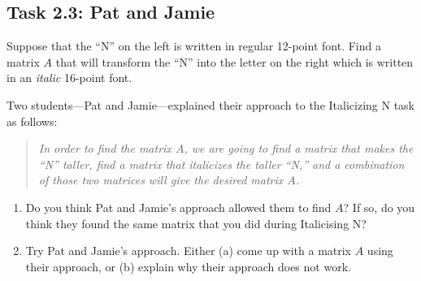 \documentclass{problemset}
\begin{document}
\begin{iola}
\section*{Task 2.3: Pat and Jamie}

\begin{minipage}{.5\textwidth}
\hfill
{}\hfill
\end{minipage}
\begin{minipage}{.5\textwidth}

Suppose that the ``N'' on the left is written in regular 12-point font.  Find a matrix $A$ that will transform
	the ``N'' into the letter on the right which is written in an \emph{italic} 16-point font.
\end{minipage}

Two students---Pat and Jamie---explained their approach to the Italicizing N task as follows:
\begin{quote}\itshape
	In order to find the matrix $A$, we are going to find a matrix that makes the ``N'' taller,
	find a matrix that italicizes the taller ``N,'' and a combination of those two matrices
	will give the desired matrix $A$.
\end{quote}

\begin{enumerate}
	\item Do you think Pat and Jamie's approach allowed them to find $A$?  If so, do
		you think they found the same matrix that you did during Italicising N?
	\item Try Pat and Jamie's approach.  Either (a) come up with a matrix $A$ using
		their approach, or (b) explain why their approach does not work.
\end{enumerate}

\end{iola}
\end{document}
